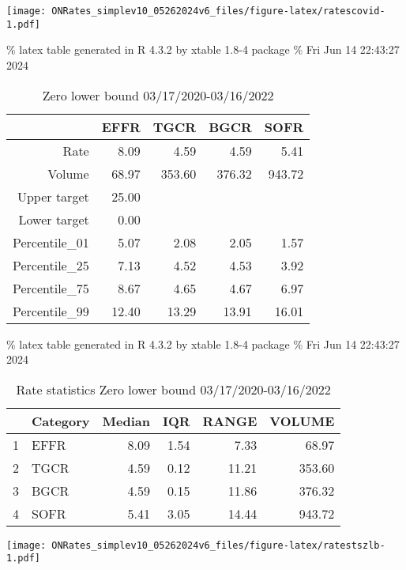 \documentclass[
]{article}
\let\origfigure\figure
\let\endorigfigure\endfigure
\renewenvironment{figure}[1][2] {
    \expandafter\origfigure\expandafter[H]
} {
    \endorigfigure
}
\begin{document}
\begin{figure}
\centering
\texttt{[image: ONRates\_simplev10\_05262024v6\_files/figure-latex/ratescovid-1.pdf]}
\caption{\label{fig:ratescovid}EFFR during covid period 11/1/2019-3/16/2020}
\end{figure}

\% latex table generated in R 4.3.2 by xtable 1.8-4 package
\% Fri Jun 14 22:43:27 2024

\begin{table}[ht]
\centering
\begin{tabular}{rrrrr}
  \hline
 & EFFR & TGCR & BGCR & SOFR \\ 
  \hline
Rate & 8.09 & 4.59 & 4.59 & 5.41 \\ 
  Volume & 68.97 & 353.60 & 376.32 & 943.72 \\ 
  Upper target & 25.00 &  &  &  \\ 
  Lower target & 0.00 &  &  &  \\ 
  Percentile\_01 & 5.07 & 2.08 & 2.05 & 1.57 \\ 
  Percentile\_25 & 7.13 & 4.52 & 4.53 & 3.92 \\ 
  Percentile\_75 & 8.67 & 4.65 & 4.67 & 6.97 \\ 
  Percentile\_99 & 12.40 & 13.29 & 13.91 & 16.01 \\ 
   \hline
\end{tabular}
\caption{Zero lower bound 03/17/2020-03/16/2022} 
\end{table}

\% latex table generated in R 4.3.2 by xtable 1.8-4 package
\% Fri Jun 14 22:43:27 2024

\begin{table}[ht]
\centering
\begin{tabular}{rlrrrr}
  \hline
 & Category & Median & IQR & RANGE & VOLUME \\ 
  \hline
1 & EFFR & 8.09 & 1.54 & 7.33 & 68.97 \\ 
  2 & TGCR & 4.59 & 0.12 & 11.21 & 353.60 \\ 
  3 & BGCR & 4.59 & 0.15 & 11.86 & 376.32 \\ 
  4 & SOFR & 5.41 & 3.05 & 14.44 & 943.72 \\ 
   \hline
\end{tabular}
\caption{Rate statistics Zero lower bound 03/17/2020-03/16/2022} 
\end{table}

\begin{figure}
\centering
\texttt{[image: ONRates\_simplev10\_05262024v6\_files/figure-latex/ratestszlb-1.pdf]}
\caption{\label{fig:ratestszlb}Rates during zero lower bound 3/17/2020-3/16/2022}
\end{figure}
\end{document}

